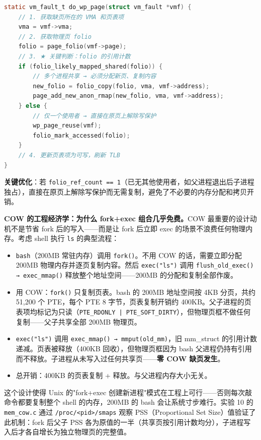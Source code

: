 \documentclass[a4paper]{article}
\begin{document}
\begin{lstlisting}[language=C, caption={do\_wp\_page 核心逻辑（mm/memory.c）}, label={lst:do_wp_page}]
static vm_fault_t do_wp_page(struct vm_fault *vmf) {
    // 1. 获取缺页所在的 VMA 和页表项
    vma = vmf->vma;
    // 2. 获取物理页 folio
    folio = page_folio(vmf->page);
    // 3. ★ 关键判断：folio 的引用计数
    if (folio_likely_mapped_shared(folio)) {
        // 多个进程共享 → 必须分配新页、复制内容
        new_folio = folio_copy(folio, vma, vmf->address);
        page_add_new_anon_rmap(new_folio, vma, vmf->address);
    } else {
        // 仅一个使用者 → 直接在原页上解除写保护
        wp_page_reuse(vmf);
        folio_mark_accessed(folio);
    }
    // 4. 更新页表项为可写，刷新 TLB
}
\end{lstlisting}

\textbf{关键优化}：若 \texttt{folio\_ref\_count == 1}（已无其他使用者，如父进程退出后子进程独占），直接在原页上解除写保护而无需复制，避免了不必要的内存分配和拷贝开销。

\textbf{COW 的工程经济学：为什么 fork+exec 组合几乎免费。}COW 最重要的设计动机不是节省 fork 后的写入——而是让 fork 后立即 exec 的场景不浪费任何物理内存。考虑 shell 执行 \texttt{ls} 的典型流程：

\begin{itemize}[leftmargin=*]
    \item \texttt{bash}（200MB 常驻内存）调用 \texttt{fork()}。不用 COW 的话，需要立即分配 200MB 物理内存并逐页复制内容。然后 \texttt{exec("ls")} 调用 \texttt{flush\_old\_exec() → exec\_mmap()} 释放整个地址空间——200MB 的分配和复制全部作废。
    \item 用 COW：\texttt{fork()} 只复制页表。bash 的 200MB 地址空间按 4KB 分页，共约 51,200 个 PTE，每个 PTE 8 字节，页表复制开销约 400KB。父子进程的页表项均标记为只读（\texttt{PTE\_RDONLY | PTE\_SOFT\_DIRTY}），但物理页框不做任何复制——父子共享全部 200MB 物理页。
    \item \texttt{exec("ls")} 调用 \texttt{exec\_mmap() → mmput(old\_mm)}，旧 mm\_struct 的引用计数递减。页表被释放（400KB 回收），但物理页框因为 bash 父进程仍持有引用而不释放。子进程从未写入过任何共享页——\textbf{零 COW 缺页发生}。
    \item 总开销：400KB 的页表复制 + 释放。与父进程内存大小无关。
\end{itemize}

这个设计使得 Unix 的"fork+exec 创建新进程"模式在工程上可行——否则每次敲命令都要复制整个 shell 的内存，200MB 的 bash 会让系统寸步难行。实验 10 的 \texttt{mem\_cow.c} 通过 \texttt{/proc/<pid>/smaps} 观察 PSS（Proportional Set Size）值验证了此机制：fork 后父子 PSS 各为原值的一半（共享页按引用计数均分），子进程写入后才各自增长为独立物理页的完整值。
\end{document}
